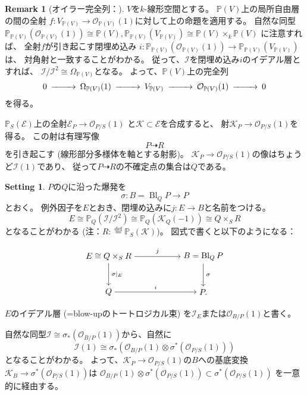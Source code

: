 \documentclass[uplatex]{jsarticle}
\theoremstyle{definition}
\newtheorem{rem}[rem]{Remark}
\newtheorem*{setting*}{Setting}
\DeclareMathOperator{\Bl}{\mathrm{Bl}}
\renewcommand{\P}{\mathbb{P}}
\newcommand{\mcE}{\mathcal{E}}
\newcommand{\mcI}{\mathcal{I}}
\newcommand{\mcK}{\mathcal{K}}
\newcommand{\mcO}{\mathcal{O}}
\newcommand{\OOO}{\mcO}
\newcommand{\OO}[1]{\OOO_{#1}}
\newcommand{\dto}{\dashrightarrow}
\newcommand{\dfn}{:\overset{\mathrm{def}}{=}}
\newcommand{\HereBeginTikz}{}
\newcommand{\HereEndTikz}{}
\begin{document}
\begin{rem}[オイラー完全列：{\cite[命題8.13]{Ha}}]
  \(V\)を\(k\)-線形空間とする。
  \(\P(V)\)上の局所自由層の間の全射
  \(f:V_{\P(V)} \to \OO{\P(V)}(1)\)に対して上の命題を適用する。
  自然な同型
  \(\P_{\P(V)}(\OO{\P(V)}(1)) \cong \P(V), \P_{\P(V)}(V_{\P(V)}) \cong \P(V) \times_k \P(V)\)
  に注意すれば、
  全射\(f\)が引き起こす閉埋め込み
  \(i:\P_{\P(V)}(\OO{\P(V)}(1)) \to \P_{\P(V)}(V_{\P(V)})\)
  は、
  対角射と一致することがわかる。
  従って、\(\mcI\)を閉埋め込み\(i\)のイデアル層とすれば、
  \(\mcI/\mcI^2 \cong \Omega_{\P(V)}\)となる。
  よって、\(\P(V)\)上の完全列
  \[
  \begin{CD}
    0 @>>> \Omega_{\P(V)}(1) @>>> V_{\P(V)} @>>> \OO{\P(V)}(1) @>>> 0
  \end{CD}
  \]
  を得る。
\end{rem}


\(\P_S(\mcE)\)上の全射\(\mcE_P\to \OO{P/S}(1)\)
と\(\mcK\subset \mcE\)を合成すると、
射\(\mcK_P\to \OO{P/S}(1)\)を得る。
この射は有理写像
\[
P\dto R
\]
を引き起こす (線形部分多様体を軸とする射影)。
\(\mcK_P\to \OO{P/S}(1)\)の像はちょうど\(\mcI(1)\)であり、
従って\(P\dto R\)の不確定点の集合は\(Q\)である。


\begin{setting*}
  \(P\)の\(Q\)に沿った爆発を
  \[
  \sigma :B = \Bl_QP\to P
  \]
  とおく。
  例外因子を\(E\)とおき、閉埋め込みに\(j:E\to B\)と名前をつける。
  \[
  E\cong \P_Q(\mcI/\mcI^2)\cong \P_Q(\mcK_Q(-1)) \cong Q\times_SR
  \]
  となることがわかる
  (注：\(R\dfn \P_S(\mcK)\))。
  図式で書くと以下のようになる：
  \HereBeginTikz
  \[
  \begin{tikzpicture}[auto]
    \node (B) at (0,1.5) {\(E \cong Q\times_SR\)};
    \node (A) at (0,0) {\(Q\)};
    \node (B') at (4,1.5) {\(B = \Bl_QP\)};
    \node (A') at (4,0) {\(P. \)};
    \draw[->] (B) to node{\scriptsize \(\sigma|_E\)} (A);
    \draw[->] (B) to node{\scriptsize \(j\)} (B');
    \draw[->] (B') to node{\scriptsize \(\sigma\)} (A');
    \draw[->] (A) to node{\scriptsize \(i\)} (A');
  \end{tikzpicture}
  \]
  \HereEndTikz
  \(E\)のイデアル層 (=blow-upのトートロジカル束)
  を\(\mcI_E\)または\(\OO{B/P}(1)\)と書く。
\end{setting*}


自然な同型\(\mcI \cong \sigma_*(\OO{B/P}(1))\)から、自然に
\[
\mcI(1) \cong \sigma_*(\OO{B/P}(1)\otimes \sigma^*(\OO{P/S}(1)))
\]
となることがわかる。
よって、\(\mcK_P\to \OO{P/S}(1)\)の\(B\)への基底変換
\(\mcK_B\to \sigma^*(\OO{P/S}(1))\)は
\(\OO{B/P}(1)\otimes \sigma^*(\OO{P/S}(1)) \subset \sigma^*(\OO{P/S}(1))\)
を一意的に経由する。
\end{document}
